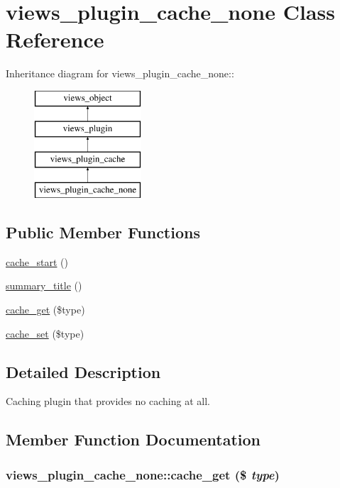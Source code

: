 \hypertarget{classviews__plugin__cache__none}{
\section{views\_\-plugin\_\-cache\_\-none Class Reference}
\label{classviews__plugin__cache__none}
}
Inheritance diagram for views\_\-plugin\_\-cache\_\-none::\begin{figure}[H]
\begin{center}
\leavevmode
\includegraphics[height=4cm]{classviews__plugin__cache__none}
\end{center}
\end{figure}
\subsection*{Public Member Functions}
\begin{CompactItemize}
\item 
\hyperlink{classviews__plugin__cache__none_17f65a53d00a8c51865027c3bce8172a}{cache\_\-start} ()
\item 
\hyperlink{classviews__plugin__cache__none_52838d0e7db62b5e92f837df6a4931b9}{summary\_\-title} ()
\item 
\hyperlink{classviews__plugin__cache__none_8c0a82cd971ea8abc1045107726a3f1d}{cache\_\-get} (\$type)
\item 
\hyperlink{classviews__plugin__cache__none_0c66f7c812356a9327ec968c7de6dc47}{cache\_\-set} (\$type)
\end{CompactItemize}


\subsection{Detailed Description}
Caching plugin that provides no caching at all. 

\subsection{Member Function Documentation}
\hypertarget{classviews__plugin__cache__none_8c0a82cd971ea8abc1045107726a3f1d}{
\subsubsection[{cache\_\-get}]{\setlength{\rightskip}{0pt plus 5cm}views\_\-plugin\_\-cache\_\-none::cache\_\-get (\$ {\em type})}}
\label{classviews__plugin__cache__none_8c0a82cd971ea8abc1045107726a3f1d}


